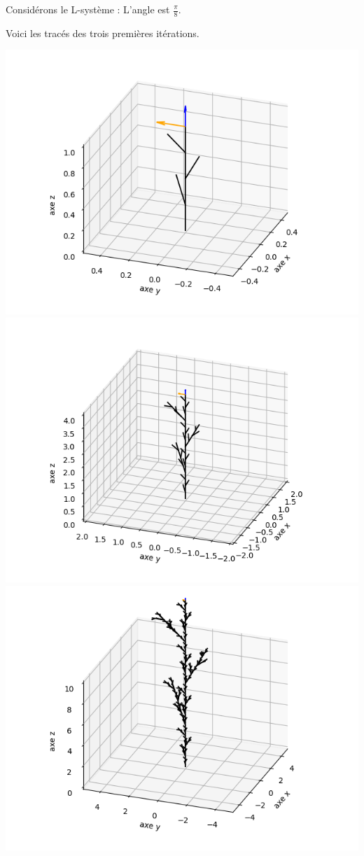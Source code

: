 \documentclass[11pt,class=report,crop=false]{standalone}
\begin{document}
Considérons le L-système :
L'angle est $\frac\pi8$.

Voici les tracés des trois premières itérations.
\begin{center}
\includegraphics[scale=\myscale,scale=0.3]{figures/plante3d-01-1}\qquad
\includegraphics[scale=\myscale,scale=0.3]{figures/plante3d-01-2}\qquad
\includegraphics[scale=\myscale,scale=0.3]{figures/plante3d-01-3}

\end{center}
\end{document}
